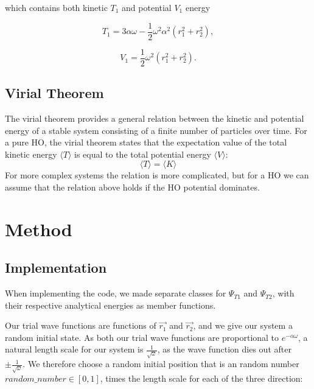 \documentclass[norsk,a4paper,12pt]{article}
\begin{document}
which contains both kinetic $T_1$ and potential $V_1$ energy

\begin{equation}
T_1 = 3\alpha \omega -\frac{1}{2}\omega^2\alpha^2\left(r_1^2 + r_2^2\right),
\label{eq:T_1}
\end{equation}

\begin{equation}
V_1 = \frac{1}{2}\omega^2(r_1^2 + r_2^2).
\end{equation}

\subsection{Virial Theorem}
The virial theorem provides a general relation between the kinetic and potential energy of a stable system consisting of a finite number of particles over time. For  a pure HO, the virial theorem states that the expectation value of the total kinetic energy $\langle T\rangle$ is equal to the total potential energy $\langle V\rangle$:
\begin{equation}
\langle T\rangle=\langle K\rangle
\label{eq:virial}
\end{equation}
For more complex systems the relation is more complicated, but for a HO we can assume that the relation above holds if the HO potential dominates.

\section{Method}

\subsection{Implementation}

When implementing the code, we made separate classes for $\Psi_{T1}$ and $\Psi_{T2}$, with their respective analytical energies as member functions. \par 
\vspace{2mm}

Our trial wave functions are functions of $\vec{r_1}$ and $\vec{r_2}$, and we give our system a random initial state. As both our trial wave functions are proportional to $e^{-\alpha \omega}$, a natural length scale for our system is $\frac{1}{\sqrt{\omega}}$, as the wave function dies out after $\pm \frac{1}{\sqrt{\omega}}$. We therefore choose a random initial position that is an random number $ random\_number \in [0,1]$, times the length scale for each of the three direction:
\end{document}

